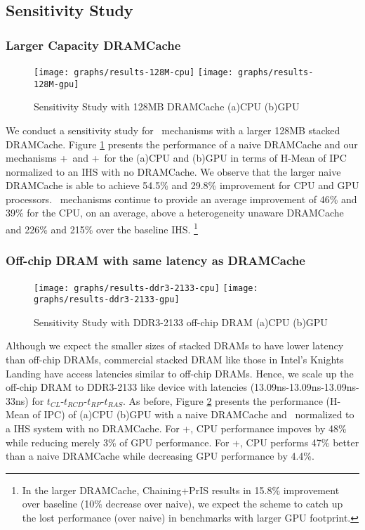 \subsection{Sensitivity Study}
\subsubsection{Larger Capacity DRAMCache}
\begin{figure}[!htb]
	\centering
	\texttt{[image: graphs/results-128M-cpu]}
	\texttt{[image: graphs/results-128M-gpu]}
	\caption{Sensitivity Study with 128MB DRAMCache (a)CPU (b)GPU}
	\label{results-128m}
\end{figure}
We conduct a sensitivity study for \cachename\ mechanisms with a larger 128MB stacked DRAMCache. Figure \ref{results-128m} presents the performance of a naive DRAMCache and our mechanisms \bypassname+\prioname\ and \chaining+\prioname\ for the (a)CPU and (b)GPU in terms of H-Mean of IPC normalized to an IHS with no DRAMCache. We observe that the larger naive DRAMCache is able to achieve 54.5\% and 29.8\% improvement for CPU and GPU processors. \cachename\ mechanisms continue to provide an average improvement of 46\% and 39\% for the CPU, on an average, above a heterogeneity unaware DRAMCache and 226\% and 215\% over the baseline IHS. 
\footnote{In the larger DRAMCache, Chaining+PrIS results in 15.8\% improvement over baseline (10\% decrease over naive), we
expect the scheme to catch up the lost performance (over naive) in benchmarks with larger GPU footprint.}


\subsubsection{Off-chip DRAM with same latency as DRAMCache} \label{sensitivity:latency}

\begin{figure}[!htb]
	\centering
	\texttt{[image: graphs/results-ddr3-2133-cpu]}
	\texttt{[image: graphs/results-ddr3-2133-gpu]}
	\caption{Sensitivity Study with DDR3-2133 off-chip DRAM (a)CPU (b)GPU}
	\label{results-2xbw}
\end{figure}

Although we expect the smaller sizes of stacked DRAMs to have lower latency than off-chip DRAMs, commercial stacked DRAM like those in Intel's Knights Landing \cite{xeonphi} have access latencies similar to off-chip DRAMs. Hence, we scale up the off-chip DRAM to DDR3-2133 like device with latencies (13.09ns-13.09ns-13.09ns-33ns) for $t_{CL}$-$t_{RCD}$-$t_{RP}$-$t_{RAS}$. As before, Figure \ref{results-2xbw} presents the performance (H-Mean of IPC) of (a)CPU (b)GPU with a naive DRAMCache and \cachename\ normalized to a IHS system with no DRAMCache. For \prioname+\bypassname, CPU performance impoves by 48\% while reducing merely 3\% of GPU performance. For \prioname+\chaining, CPU performs 47\% better than a naive DRAMCache while decreasing GPU performance by 4.4\%.

